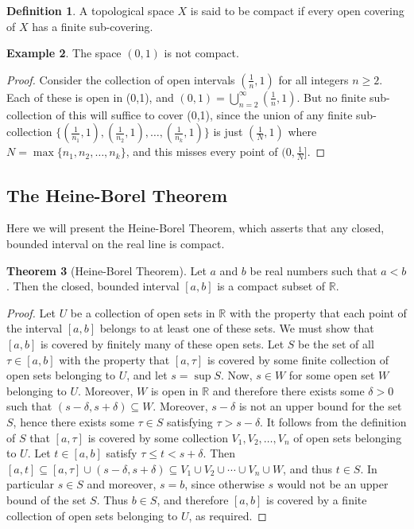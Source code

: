 \documentclass[11pt,a4paper]{article}
\theoremstyle{definition}
\newtheorem{thm}{Theorem}[subsection]
\newtheorem{defn}[thm]{Definition}
\newtheorem{exa}[thm]{Example}
\begin{document}
\begin{defn}
A topological space $X$ is said to be compact if every open covering of $X$ has a finite sub-covering.
\end{defn}



\begin{exa}
The space $(0,1)$ is not compact.
\end{exa}

\begin{proof}
Consider the collection of open intervals $(\frac{1}{n},1)$ for all integers $n\geq 2$. Each of these is open in (0,1), and $(0,1)=\bigcup^{\infty}_{n=2}(\frac{1}{n},1)$. But no finite sub-collection of this will suffice to cover (0,1), since the union of any finite sub-collection $\{(\frac{1}{n_1},1), (\frac{1}{n_2},1),\ldots,(\frac{1}{n_k},1)\}$ is just $(\frac{1}{N},1)$ where $N=\max\{n_1,n_2,\ldots,n_k\}$, and this misses every point of $(0,\frac{1}{N}]$.
\end{proof}


\subsection{The Heine-Borel Theorem}
Here we will present the Heine-Borel Theorem, which asserts that any closed, bounded interval on the real line is compact.


\begin{thm}[Heine-Borel Theorem]
Let $a$ and $b$ be real numbers such that $a<b$. Then the closed, bounded interval $[a,b]$ is a compact subset of $\mathbb{R}$.
\end{thm}

\begin{proof}
Let $U$ be a collection of open sets in $\mathbb{R}$ with the property that each point of the interval $[a,b]$ belongs to at least one of these sets. We must show that $[a,b]$ is covered by finitely many of these open sets. Let $S$ be the set of all $\tau \in [a,b]$ with the property that $[a,\tau ]$ is covered by some finite collection of open sets belonging to $U$, and let $s=\sup S$. Now, $s\in W$ for some open set $W$ belonging to $U$. Moreover, $W$ is open in $\mathbb{R}$ and therefore there exists some $\delta >0$ such that $(s-\delta,s+\delta)\subseteq W$. Moreover, $s-\delta$ is not an upper bound for the set $S$, hence there exists some $\tau \in S$ satisfying $\tau >s-\delta$. It follows from the definition of $S$ that $[a,\tau]$ is covered by some collection $V_1,V_2,\ldots,V_n$ of open sets belonging to $U$. Let $t\in [a,b]$ satisfy $\tau \leq t<s+\delta$. Then $[a,t]\subseteq [a,\tau ]\cup (s-\delta,s+\delta)\subseteq V_1\cup V_2\cup\cdots\cup V_n\cup W$, and thus $t\in S$. In particular $s\in S$ and moreover, $s=b$, since otherwise $s$ would not be an upper bound of the set $S$. Thus $b\in S$, and therefore $[a,b]$ is covered by a finite collection of open sets belonging to $U$, as required.
\end{proof}
\end{document}
